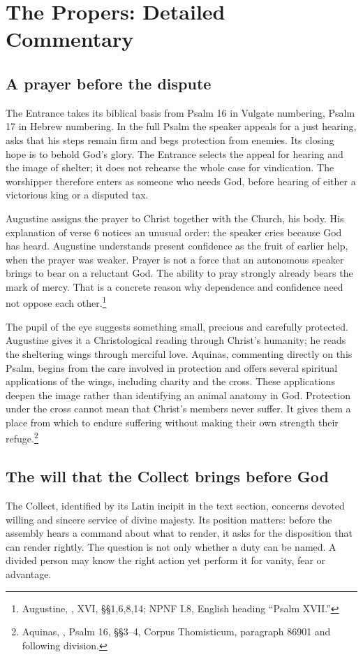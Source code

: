 \section{The Propers: Detailed Commentary}
\subsection{A prayer before the dispute}
The Entrance takes its biblical basis from Psalm 16 in Vulgate numbering, Psalm 17 in Hebrew numbering. In the full Psalm the speaker appeals for a just hearing, asks that his steps remain firm and begs protection from enemies. Its closing hope is to behold God's glory. The Entrance selects the appeal for hearing and the image of shelter; it does not rehearse the whole case for vindication. The worshipper therefore enters as someone who needs God, before hearing of either a victorious king or a disputed tax.

Augustine assigns the prayer to Christ together with the Church, his body. His explanation of verse 6 notices an unusual order: the speaker cries because God has heard. Augustine understands present confidence as the fruit of earlier help, when the prayer was weaker. Prayer is not a force that an autonomous speaker brings to bear on a reluctant God. The ability to pray strongly already bears the mark of mercy. That is a concrete reason why dependence and confidence need not oppose each other.\footnote{Augustine, , XVI, §§1,6,8,14; NPNF I.8, English heading ``Psalm XVII.''}

The pupil of the eye suggests something small, precious and carefully protected. Augustine gives it a Christological reading through Christ's humanity; he reads the sheltering wings through merciful love. Aquinas, commenting directly on this Psalm, begins from the care involved in protection and offers several spiritual applications of the wings, including charity and the cross. These applications deepen the image rather than identifying an animal anatomy in God. Protection under the cross cannot mean that Christ's members never suffer. It gives them a place from which to endure suffering without making their own strength their refuge.\footnote{Aquinas, , Psalm 16, §§3--4, Corpus Thomisticum, paragraph 86901 and following division.}

\subsection{The will that the Collect brings before God}
The Collect, identified by its Latin incipit in the text section, concerns devoted willing and sincere service of divine majesty. Its position matters: before the assembly hears a command about what to render, it asks for the disposition that can render rightly. The question is not only whether a duty can be named. A divided person may know the right action yet perform it for vanity, fear or advantage.

